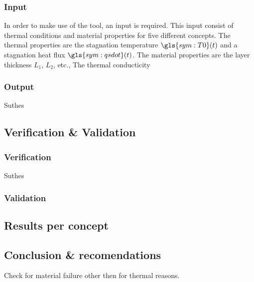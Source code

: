 \subsubsection{Input}
In order to make use of the tool, an input is required. This input consist of thermal conditions and material properties for five different concepts. The thermal properties are the stagnation temperature $ \gls{sym:T0}(t) $ and a stagnation heat flux $ \gls{sym:qsdot}(t) $. The material properties are the layer thickness $ L_1 $, $ L_2 $, etc., The thermal conducticity 

\subsubsection{Output}
Suthes


\subsection{Verification \& Validation}

\subsubsection{Verification}
Suthes
\subsubsection{Validation}



\subsection{Results per concept}



\subsection{Conclusion \& recomendations}
Check for material failure other then for thermal reasons.
